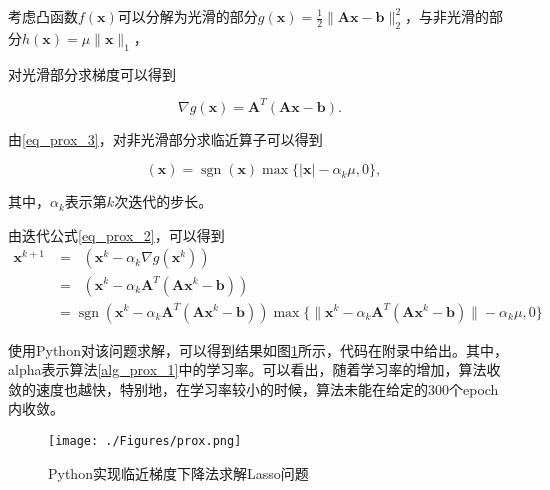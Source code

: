 \begin{solution}
    考虑凸函数$f(\bm{x})$可以分解为光滑的部分$g(\bm{x})=\frac{1}{2}\|\bm{A} \bm{x}-\bm{b}\|_{2}^{2}$，与非光滑的部分$h(\bm{x})=\mu\|\bm{x}\|_{1}$，

    对光滑部分求梯度可以得到

    \begin{equation*}
        \nabla g(\bm{x}) = \bm{A}^{T}(\bm{A} \bm{x}-\bm{b}).
    \end{equation*}

    由\ref{eq_prox_3}，对非光滑部分求临近算子可以得到

    \begin{equation*}
        \mathop{\mathrm{prox_{\alpha_{k}h}}}(\bm{x}) = \mathop{\mathrm{sgn}}(\bm{x})\max\{|\bm{x}|-\alpha_{k}\mu, 0\},
    \end{equation*}

    其中，$\alpha_{k}$表示第$k$次迭代的步长。

    由迭代公式\ref{eq_prox_2}，可以得到
    \begin{equation}
        \begin{split}
            \bm{x}^{k+1} &= \mathop{\mathrm{prox_{\alpha_{k}h}}}(\bm{x}^{k} - \alpha_{k}\nabla g(\bm{x}^{k})) \\
            &=\mathop{\mathrm{prox_{\alpha_{k}h}}}(\bm{x}^{k} - \alpha_{k}\bm{A}^{T}(\bm{A} \bm{x}^{k}-\bm{b})) \\
            &=\mathop{\mathrm{sgn}}(\bm{x}^{k} - \alpha_{k}\bm{A}^{T}(\bm{A} \bm{x}^{k}-\bm{b}))\max\{\|\bm{x}^{k} - \alpha_{k}\bm{A}^{T}(\bm{A} \bm{x}^{k}-\bm{b})\|-\alpha_{k}\mu, 0\}
        \end{split}
    \end{equation}

    使用Python对该问题求解，可以得到结果如图\ref{figure_prox}所示，代码在附录中给出。其中，alpha表示算法\ref{alg_prox_1}中的学习率。可以看出，随着学习率的增加，算法收敛的速度也越快，特别地，在学习率较小的时候，算法未能在给定的300个epoch内收敛。

    \begin{figure}[hbtp]
        \centering
        \texttt{[image: ./Figures/prox.png]}
        \caption{Python实现临近梯度下降法求解Lasso问题}
        \label{figure_prox}
    \end{figure}
\end{solution}
